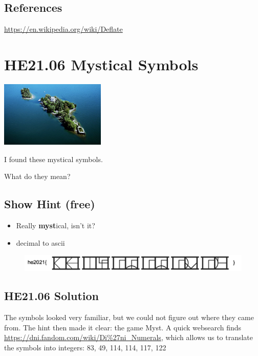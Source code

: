 \documentclass[english,a4paper,nols,noindent]{tufte-handout}
\begin{document}
\subsection{References}
\url{https://en.wikipedia.org/wiki/Deflate}


\hypertarget{he21.06}{%
  \section{HE21.06 Mystical Symbols}
  \label{he21.06}}
\begin{marginfigure}
    \includegraphics[width=50mm]{images/challenge6.jpg}
\end{marginfigure}

\noindent I found these mystical symbols.

\noindent What do they mean?

\subsection{Show Hint (free)}
\begin{itemize}
\item Really \textbf{myst}ical, isn't it?
\item decimal to ascii
\end{itemize}

\begin{figure}
    \includegraphics[width=150mm]{ch06/symbols.png}
\end{figure}


\hypertarget{he21.06-solution}{%
\subsection{HE21.06 Solution}\label{he21.06-solution}}

\noindent The symbols looked very familiar, but we could not figure
out where they came from.  The hint then made it clear: the game Myst.
A quick websearch finds
\url{https://dni.fandom.com/wiki/Di\%27ni_Numerals}, which allows us
to translate the symbols into integers: 83, 49, 114, 114, 117, 122
\end{document}
